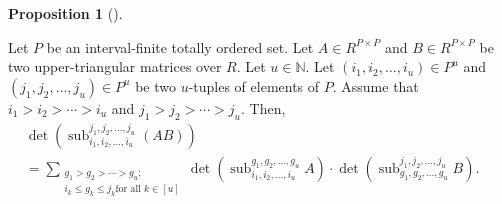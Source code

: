 \documentclass[numbers=enddot,12pt,final,onecolumn,notitlepage]{scrartcl}%
\numberwithin{exer}{section}
\theoremstyle{definition}
\newtheorem{prop}[theo]{Proposition}
\newenvironment{proposition}[1][]
{\begin{prop}[#1]\begin{leftbar}}
{\end{leftbar}\end{prop}}
\let\sumnonlimits\sum
\renewcommand{\sum}{\sumnonlimits\limits}
\theoremstyle{plainsl}
\begin{document}
\begin{proposition}
\label{prop.CB5}Let $P$ be an interval-finite totally ordered set. Let $A\in
R^{P\times P}$ and $B\in R^{P\times P}$ be two upper-triangular matrices over
$R$. Let $u\in\mathbb{N}$. Let $\left(  i_{1},i_{2},\ldots,i_{u}\right)  \in
P^{u}$ and $\left(  j_{1},j_{2},\ldots,j_{u}\right)  \in P^{u}$ be two
$u$-tuples of elements of $P$. Assume that $i_{1}>i_{2}>\cdots>i_{u}$ and
$j_{1}>j_{2}>\cdots>j_{u}$. Then,%
\begin{align}
&  \det\left(  \operatorname*{sub}\nolimits_{i_{1},i_{2},\ldots,i_{u}}%
^{j_{1},j_{2},\ldots,j_{u}}\left(  AB\right)  \right) \nonumber\\
&  =\sum_{\substack{g_{1}>g_{2}>\cdots>g_{u};\\i_{k}\leq g_{k}\leq j_{k}\text{
for all }k\in\left[  u\right]  }}\det\left(  \operatorname*{sub}%
\nolimits_{i_{1},i_{2},\ldots,i_{u}}^{g_{1},g_{2},\ldots,g_{u}}A\right)
\cdot\det\left(  \operatorname*{sub}\nolimits_{g_{1},g_{2},\ldots,g_{u}%
}^{j_{1},j_{2},\ldots,j_{u}}B\right)
.\ \ \ \ \ \ \ \ \ \ \label{pf.lem.Stilde.coproduct.CB5}%
\end{align}

\end{proposition}
\end{document}

